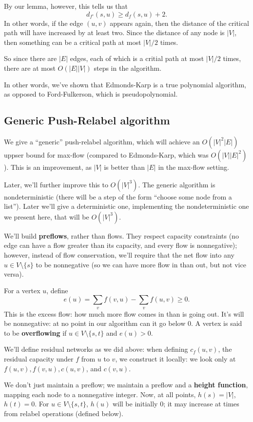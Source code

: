 \documentclass{article}
\begin{document}
By our lemma, however, this tells us that
$$
d_{f'}(s,u) \geq
d_{f} (s,u) + 2.
$$
In other words, if the edge $(u,v)$ appears again, then the distance of the
critical path will have increased by at least two.
Since the distance of any node is $|V|$, then something can be a critical
path at most $|V| / 2$ times.

So since there are $|E|$ edges, each of which is a critial path at most
$|V| / 2$ times, there are at most $O(|E| |V|)$ steps in the algorithm.

In other words, we've shown that Edmonds-Karp is a true polynomial algorithm,
as opposed to Ford-Fulkerson, which is pseudopolynomial.


\subsection{Generic Push-Relabel algorithm}

We give a ``generic'' push-relabel algorithm, which will achieve
an $O(|V|^2|E|)$ uppser bound for max-flow (compared to Edmonds-Karp, which
was $O(|V| |E|^2)$).
This is an improvement, as $|V|$ is better than $|E|$ in the max-flow setting.

Later, we'll further improve this to $O(|V|^3)$.
The generic algorithm is nondeterministic (there will be a step of the form
``choose some node from a list''). Later we'll give a deterministic one,
implementing the nondeterministic one we present here, that will be $O(|V|^3)$.

We'll build \textbf{preflows}, rather than flows. They respect capacity 
constraints
(no edge can have a flow greater than its capacity, and every flow is 
nonnegative); however, instead of flow conservation, we'll require that
the net flow into any $u\in V\setminus\{s\}$ to be nonnegative (so we
can have more flow in than out, but not vice versa).

For a vertex $u$, define
$$
e(u) = \sum_v f(v,u) - \sum_v f(u,v) 
\geq 0.
$$
This is the excess flow: how much more flow comes in than is going out.
It's will be nonnegative: at no point in our algorithm can it go below 0.
A vertex is said to be \textbf{overflowing} if $u\in V\setminus\{s,t\}$ and 
$e(u) > 0$.

We'll define residual networks as we did above: when defining $c_f(u,v)$, the
residual capacity under $f$ from $u$ to $v$, we construct it locally: we look
only at $f(u,v), f(v,u), c(u,v)$, and $c(v,u)$.

We don't just maintain a preflow; we maintain a preflow and a \textbf{height
function}, mapping each node to a nonnegative integer.
Now, at all points, $h(s) = |V|$, $h(t) = 0$.
For $u\in V\setminus\{s,t\}$, $h(u)$ will be initially 0; it may increase
at times from relabel operations (defined below).
\end{document}
